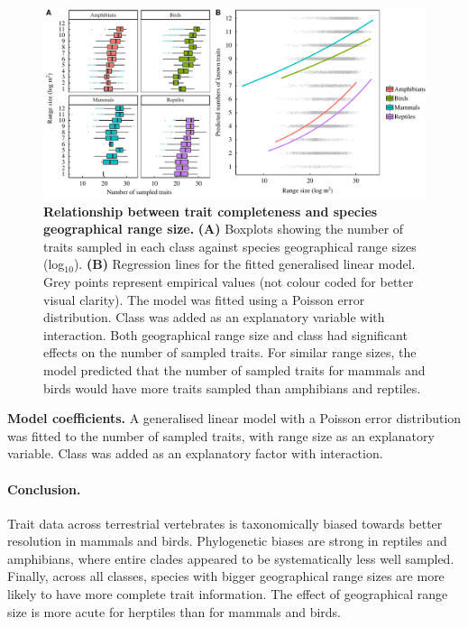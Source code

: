\begin{figure}[h!]
\centering
\includegraphics[scale=0.7]{figures/chapter2/NA_spatial_patterns/Poisson_model_predictions}
\caption[Relationship between trait completeness and species geographical range size]{\textbf{Relationship between trait completeness and species geographical range size.} \textbf{(A)} Boxplots showing the number of traits sampled in each class against species geographical range sizes (log$_{10}$). \textbf{(B)} Regression lines for the fitted generalised linear model. Grey points represent empirical values (not colour coded for better visual clarity). The model was fitted using a Poisson error distribution. Class was added as an explanatory variable with interaction. Both geographical range size and class had significant effects on the number of sampled traits. For similar range sizes, the model predicted that the number of sampled traits for mammals and birds would have more traits sampled than amphibians and reptiles.}
\label{poisson}
\end{figure}

\begin{table}[h!]
\renewcommand{\baselinestretch}{1}
\renewcommand{\arraystretch}{1.5}
\begin{center}\fontsize{9}{11}\selectfont
{}
\caption[Model coefficients]{\textbf{Model coefficients.} A generalised linear model with a Poisson error distribution was fitted to the number of sampled traits, with range size as an explanatory variable. Class was added as an explanatory factor with interaction.}
\end{center}
\label{Poisson_model_coef}
\end{table}


\paragraph{Conclusion.} Trait data across terrestrial vertebrates is taxonomically biased towards better resolution in mammals and birds. Phylogenetic biases are strong in reptiles and amphibians, where entire clades appeared to be systematically less well sampled. Finally, across all classes, species with bigger geographical range sizes are more likely to have more complete trait information. The effect of geographical range size is more acute for herptiles than for mammals and birds.

